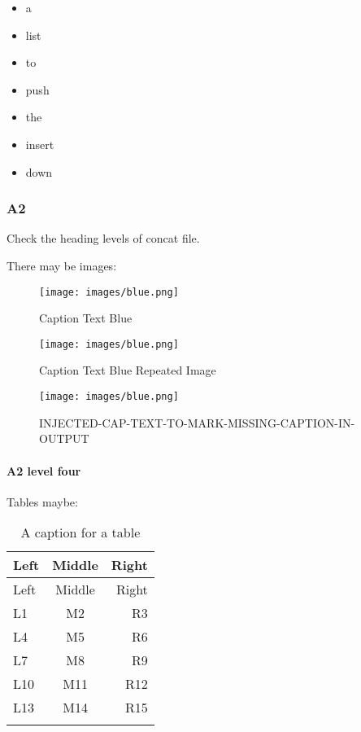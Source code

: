 \begin{itemize}
\tightlist
\item
  a
\item
  list
\item
  to
\item
  push
\item
  the
\item
  insert
\item
  down
\end{itemize}

\hypertarget{a2}{%
\subsubsection{A2}\label{a2}}

Check the heading levels of concat file.

There may be images:

\begin{figure}
\centering
\texttt{[image: images/blue.png]}
\caption{Caption Text Blue \label{fig:blue}}
\end{figure}


\begin{figure}
\centering
\texttt{[image: images/blue.png]}
\caption{Caption Text Blue Repeated Image \label{fig:blue}}
\end{figure}

\begin{figure}
\centering
\texttt{[image: images/blue.png]}
\caption{INJECTED-CAP-TEXT-TO-MARK-MISSING-CAPTION-IN-OUTPUT \label{fig:blue}}
\end{figure}

\hypertarget{a2-level-four}{%
\paragraph{A2 level four}\label{a2-level-four}}

Tables maybe:

\begin{longtable}[]{@{}lcr@{}}
\toprule()
Left & Middle & Right \\
\midrule()
\endfirsthead
\toprule()
Left & Middle & Right \\
\midrule()
\endhead
L1 & M2 & R3 \\
L4 & M5 & R6 \\
L7 & M8 & R9 \\
L10 & M11 & R12 \\
L13 & M14 & R15 \\
\bottomrule()
\rowcolor{white}
\caption{A caption for a table
\label{table:left-middle-right}}\tabularnewline
\end{longtable}

